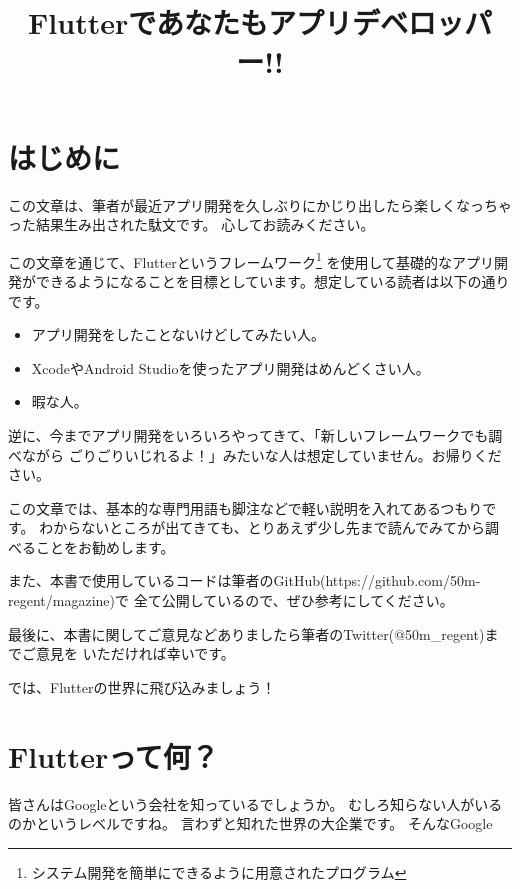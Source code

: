 \documentclass{jsarticle}
\title{Flutterであなたもアプリデベロッパー!!}
\author{}
\date{}
\begin{document}
    \maketitle
    \tableofcontents

    \section*{はじめに}
        この文章は、筆者が最近アプリ開発を久しぶりにかじり出したら楽しくなっちゃった結果生み出された駄文です。
        心してお読みください。

        この文章を通じて、Flutterというフレームワーク\footnote{システム開発を簡単にできるように用意されたプログラム}
        を使用して基礎的なアプリ開発ができるようになることを目標としています。想定している読者は以下の通りです。

        \begin{itemize}
            \item アプリ開発をしたことないけどしてみたい人。
            \item XcodeやAndroid Studioを使ったアプリ開発はめんどくさい人。
            \item 暇な人。
        \end{itemize}

        逆に、今までアプリ開発をいろいろやってきて、「新しいフレームワークでも調べながら
        ごりごりいじれるよ！」みたいな人は想定していません。お帰りください。

        この文章では、基本的な専門用語も脚注などで軽い説明を入れてあるつもりです。
        わからないところが出てきても、とりあえず少し先まで読んでみてから調べることをお勧めします。

        また、本書で使用しているコードは筆者のGitHub(https://github.com/50m-regent/magazine)で
        全て公開しているので、ぜひ参考にしてください。

        最後に、本書に関してご意見などありましたら筆者のTwitter(@50m\_regent)までご意見を
        いただければ幸いです。

        では、Flutterの世界に飛び込みましょう！

    \section*{Flutterって何？}
        皆さんはGoogleという会社を知っているでしょうか。
        むしろ知らない人がいるのかというレベルですね。
        言わずと知れた世界の大企業です。
        そんなGoogle
    
\end{document}
